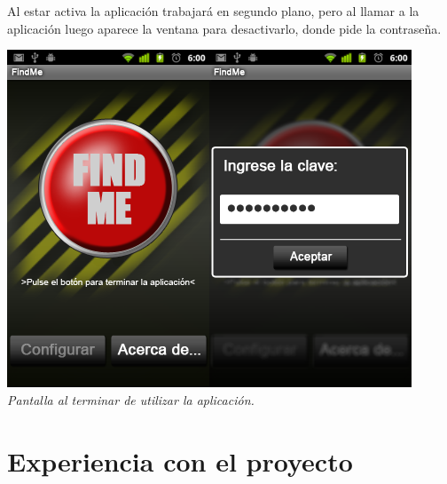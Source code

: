 \documentclass{article}
\begin{document}
Al estar activa la aplicación trabajará en segundo plano, pero al llamar a la aplicación luego aparece la ventana para desactivarlo, donde pide la contraseña.
\begin{center}
\includegraphics{findmesscreenfinal}\includegraphics{findmesscreenfinal2}\\\emph{Pantalla al terminar de utilizar la aplicación.}
\end{center}

\newpage
\section{Experiencia con el proyecto}
\end{document}
